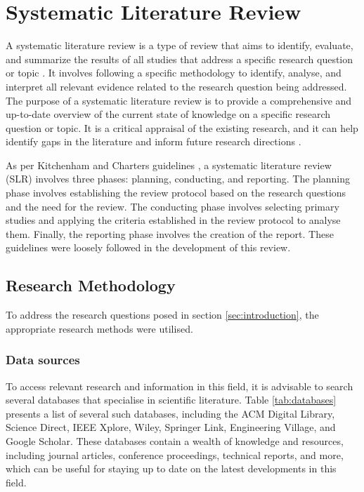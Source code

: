 \documentclass[conference]{IEEEtran}
\begin{document}
\section{Systematic Literature Review}

A systematic literature review is a type of review that aims to identify,
evaluate, and summarize the results of all studies that address a specific
research question or topic
\cite{kitchenham2007guidelines,kitchenham2009systematic,gough2017introduction}.
It involves following a specific methodology to identify, analyse, and
interpret all relevant evidence related to the research question being
addressed. The purpose of a systematic literature review is to provide a
comprehensive and up-to-date overview of the current state of knowledge on a
specific research question or topic. It is a critical appraisal of the existing
research, and it can help identify gaps in the literature and inform future
research directions \cite{kitchenham2007guidelines}.

As per Kitchenham and Charters guidelines \cite{kitchenham2007guidelines}, a
systematic literature review (SLR) involves three phases: planning, conducting,
and reporting. The planning phase involves establishing the review protocol
based on the research questions and the need for the review. The conducting
phase involves selecting primary studies and applying the criteria established
in the review protocol to analyse them. Finally, the reporting phase involves
the creation of the report. These guidelines were loosely followed in the
development of this review.

\subsection{Research Methodology} \label{sub:research-methodology}

To address the research questions posed in section \ref{sec:introduction}, the
appropriate research methods were utilised.

\subsubsection{Data sources}

To access relevant research and information in this field, it is advisable to
search several databases that specialise in scientific literature. Table
\ref{tab:databases} presents a list of several such databases, including the
ACM Digital Library, Science Direct, IEEE Xplore, Wiley, Springer Link,
Engineering Village, and Google Scholar. These databases contain a wealth of
knowledge and resources, including journal articles, conference proceedings,
technical reports, and more, which can be useful for staying up to date on the
latest developments in this field.
\end{document}
